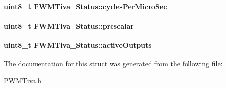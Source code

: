 \paragraph[{cycles\+Per\+Micro\+Sec}]{\setlength{\rightskip}{0pt plus 5cm}uint8\+\_\+t P\+W\+M\+Tiva\+\_\+\+Status\+::cycles\+Per\+Micro\+Sec}\label{struct_p_w_m_tiva___status_ab45856183a3fe6f2f350d49b9d60330e}
\paragraph[{prescalar}]{\setlength{\rightskip}{0pt plus 5cm}uint8\+\_\+t P\+W\+M\+Tiva\+\_\+\+Status\+::prescalar}\label{struct_p_w_m_tiva___status_a92fbd5e7351f2114f0403ca363eb51fb}
\paragraph[{active\+Outputs}]{\setlength{\rightskip}{0pt plus 5cm}uint8\+\_\+t P\+W\+M\+Tiva\+\_\+\+Status\+::active\+Outputs}\label{struct_p_w_m_tiva___status_a7f5f9f86d8c0ddc3d90296fadf6e1133}


The documentation for this struct was generated from the following file\+:\begin{DoxyCompactItemize}
\item 
\hyperlink{_p_w_m_tiva_8h}{P\+W\+M\+Tiva.\+h}\end{DoxyCompactItemize}

